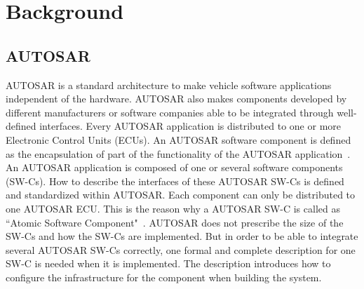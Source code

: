 \section{Background}\label{sec:background}



\subsection{AUTOSAR}

AUTOSAR is a standard architecture to make vehicle software applications independent of the hardware. 
AUTOSAR also makes components developed by different manufacturers or software companies able to be integrated through well-defined interfaces.
Every AUTOSAR application is distributed to one or more Electronic Control Units (ECUs). 
An AUTOSAR software component is defined as the encapsulation of part of the functionality of the AUTOSAR application~\cite{aa}. An AUTOSAR application is composed of one or several software components (SW-Cs). How to describe the interfaces of these AUTOSAR SW-Cs is defined and standardized within AUTOSAR. Each component can only be distributed to one AUTOSAR ECU. This is the reason why a AUTOSAR SW-C is called as ``Atomic Software Component"~\cite{aa}. AUTOSAR does not prescribe the size of the SW-Cs and how the SW-Cs are implemented. But in order to be able to  integrate several AUTOSAR SW-Cs correctly, one formal and complete description for one SW-C is needed when it is implemented. The description introduces how to configure the infrastructure for the component when building the system. 

